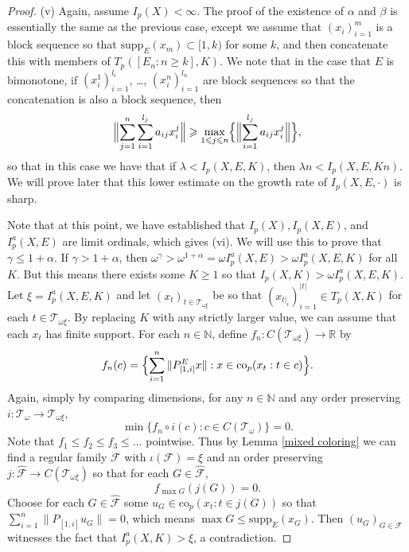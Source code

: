 \documentclass[12pt]{amsart}
\theoremstyle{definition}
\newcommand{\rr}{\mathbb{R}}
\newcommand{\nn}{\mathbb{N}}
\newcommand{\fff}{\mathcal{F}}
\newcommand{\ttt}{\mathcal{T}}
\newcommand{\supp}{\mathrm{supp}}
\begin{document}
\begin{proof}
(v) Again, assume $I_p(X)<\infty$.  The proof of the existence of $\alpha$ and $\beta$ is essentially the same as the previous case, except we assume that $(x_i)_{i=1}^m$ is a block sequence so that $\supp_E(x_m)\subset [1,k)$ for some $k$, and then concatenate this with members of $T_p([E_n:n\geqslant k], K)$.  We note that in the case that $E$ is bimonotone, if $(x^1_i)_{i=1}^{l_i}$, \ldots, $(x^n_i)_{i=1}^{l_n}$ are block sequences so that the concatenation is also a block sequence, then $$\Bigl\|\sum_{j=1}^n \sum_{i=1}^{l_j} a_{ij}x^j_i\Bigr\|\geqslant \max_{1\leqslant j\leqslant n}\Bigl\{\Bigl\|\sum_{i=1}^{l_j} a_{ij}x^j_i\Bigr\|\Bigr\},$$ so that in this case we have that if $\lambda<I_p(X, E, K)$, then $\lambda n<I_p(X, E, Kn)$.  We will prove later that this lower estimate on the growth rate of $I_p(X,E,\cdot)$ is sharp.  

Note that at this point, we have established that $I_p(X), I_p(X,E)$, and $I^a_p(X, E)$ are limit ordinals, which gives (vi).  We will use this to prove that $\gamma\leqslant 1+\alpha$.  If $\gamma>1+\alpha$, then $\omega^\gamma> \omega^{1+\alpha}=\omega I^a_p(X,E)>\omega I^a_p(X, E, K)$ for all $K$.  But this means there exists some $K\geqslant 1$ so that $I_p(X, K)>\omega I^a_p(X,E,K)$.  Let $\xi= I^a_p(X,E,K)$ and let $(x_t)_{t\in \ttt_{\omega\xi}}$ be so that $(x_{t|_i})_{i=1}^{|t|}\in T_p(X, K)$ for each $t\in \ttt_{\omega\xi}$. By replacing $K$ with any strictly larger value, we can assume that each $x_t$ has finite support.  For each $n\in \nn$, define $f_n:C(\ttt_{\omega\xi})\to \rr$ by $$f_n(c)=\Bigl\{\sum_{i=1}^n \|P^E_{[1,i]}x\|: x\in \text{co}_p(x_t:t\in c)\Bigr\}.$$  Again, simply by comparing dimensions, for any $n\in \nn$ and any order preserving $i:\ttt_\omega\to \ttt_{\omega\xi}$, $$\min \{f_n\circ i(c):c\in C(\ttt_\omega)\}=0.$$  Note that $f_1\leqslant f_2\leqslant f_3\leqslant \ldots$ pointwise.  Thus by Lemma \ref{mixed coloring} we can find a regular family $\fff$ with $\iota(\fff)=\xi$ and an order preserving $j:\widehat{\fff}\to C(\ttt_{\omega\xi})$ so that for each $G\in \widehat{\fff}$, $$f_{\max G}(j(G))=0.$$ Choose for each $G\in \widehat{\fff}$ some $u_G\in \text{co}_p(x_t:t\in j(G))$ so that $\sum_{i=1}^n \|P_{[1,i]}u_G\|=0$, which means $\max G \leqslant \supp_E(x_G)$.  Then $(u_G)_{G\in \widehat{\fff}}$ witnesses the fact that $I^a_p(X, K)>\xi$, a contradiction.  






\end{proof}
\end{document}

